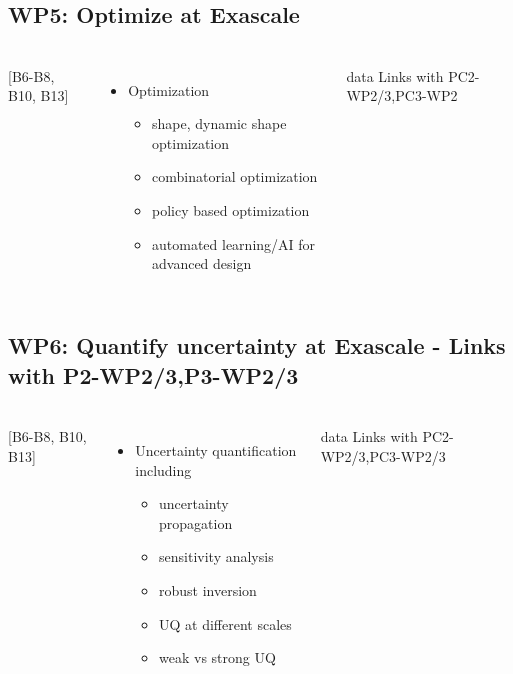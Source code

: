 \subsection{WP5: Optimize at Exascale }
\begin{frame}
  \frametitle{\insertsectionhead}
  \framesubtitle{\insertsubsectionhead}
  \begin{columns}
    [B6-B8, B10, B13]
    \begin{itemize}
      \item Optimization 
      \begin{itemize}
        \item shape, dynamic shape optimization
        \item combinatorial optimization
        \item policy based optimization
        \item automated learning/AI for advanced design
      \end{itemize}
    \end{itemize}
    \begin{alertblock}{data}
      Links with PC2-WP2/3,PC3-WP2 
    \end{alertblock}
  \end{columns}
\end{frame}

\subsection{WP6: Quantify uncertainty at Exascale - Links with P2-WP2/3,P3-WP2/3 }
\begin{frame}
  \frametitle{\insertsectionhead}
  \framesubtitle{\insertsubsectionhead}
  \begin{columns}
    [B6-B8, B10, B13]
    \begin{itemize}
      \item Uncertainty quantification including 
      \begin{itemize}
        \item uncertainty propagation
        \item sensitivity analysis
        \item robust inversion
        \item UQ at different scales
        \item weak vs strong UQ
      \end{itemize}
    \end{itemize}
    \begin{alertblock}{data}
      Links with PC2-WP2/3,PC3-WP2/3
    \end{alertblock}
  \end{columns}
\end{frame}

